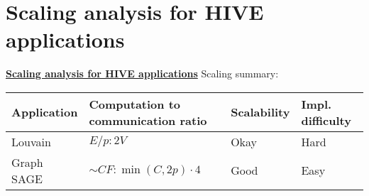 \documentclass[10pt,oneside]{memoir}
\begin{document}
\hypertarget{scaling-analysis-for-hive-applications}{%
\section{Scaling analysis for HIVE
applications}\label{scaling-analysis-for-hive-applications}}

\textbf{\href{https://gunrock.github.io/docs/hive_scaling.html}{Scaling
analysis for HIVE applications}} Scaling summary:

\begin{longtable}[]{@{}llll@{}}
\toprule
\begin{minipage}[b]{0.25\columnwidth}\raggedright
Application\strut
\end{minipage} & \begin{minipage}[b]{0.37\columnwidth}\raggedright
Computation to communication ratio\strut
\end{minipage} & \begin{minipage}[b]{0.12\columnwidth}\raggedright
Scalability\strut
\end{minipage} & \begin{minipage}[b]{0.14\columnwidth}\raggedright
Impl. difficulty\strut
\end{minipage}\tabularnewline
\midrule
\endhead
\begin{minipage}[t]{0.25\columnwidth}\raggedright
Louvain\strut
\end{minipage} & \begin{minipage}[t]{0.37\columnwidth}\raggedright
\(E/p : 2V\)\strut
\end{minipage} & \begin{minipage}[t]{0.12\columnwidth}\raggedright
Okay\strut
\end{minipage} & \begin{minipage}[t]{0.14\columnwidth}\raggedright
Hard\strut
\end{minipage}\tabularnewline
\begin{minipage}[t]{0.25\columnwidth}\raggedright
Graph SAGE\strut
\end{minipage} & \begin{minipage}[t]{0.37\columnwidth}\raggedright
\(\sim CF : \min(C, 2p) \cdot 4\)\strut
\end{minipage} & \begin{minipage}[t]{0.12\columnwidth}\raggedright
Good\strut
\end{minipage} & \begin{minipage}[t]{0.14\columnwidth}\raggedright
Easy\strut
\end{minipage}\tabularnewline

\end{longtable}
\end{document}
